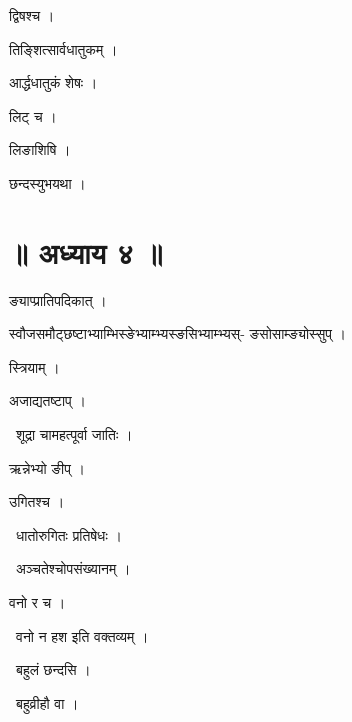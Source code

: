 \documentclass[10pt, openany, oneside]{book}
\begin{document}
\noindent द्विषश्च ।

\noindent तिङ्शित्सार्वधातुकम् ।

\noindent आर्द्धधातुकं शेषः ।

\noindent लिट् च ।

\noindent लिङाशिषि ।

\noindent छन्दस्युभयथा ।

\section*{॥ अध्याय ४ ॥}

\noindent ङ्याप्प्रातिपदिकात् ।

\noindent स्वौजसमौट्छष्टाभ्याम्भिस्ङेभ्याम्भ्यस्ङसिभ्याम्भ्यस्- ङसोसाम्ङ्योस्सुप् ।

\noindent स्त्रियाम् ।

\noindent अजाद्यतष्टाप् ।

\par\noindent\hspace{1.5em}{\vps वा॰}~{\qt शूद्रा चामहत्पूर्वा जातिः ।}

\noindent ऋन्नेभ्यो ङीप् ।

\noindent उगितश्च ।

\par\noindent\hspace{1.5em}{\vps वा॰}~{\qt धातोरुगितः प्रतिषेधः ।}

\par\noindent\hspace{1.5em}{\vps वा॰}~{\qt अञ्चतेश्चोपसंख्यानम् ।}

\noindent वनो र च ।

\par\noindent\hspace{1.5em}{\vps वा॰}~{\qt वनो न हश इति वक्तव्यम् ।}

\par\noindent\hspace{1.5em}{\vps वा॰}~{\qt बहुलं छन्दसि ।}

\par\noindent\hspace{1.5em}{\vps वा॰}~{\qt बहुव्रीहौ वा ।}
\end{document}

